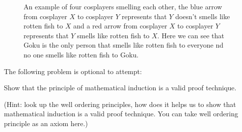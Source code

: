 \documentclass[a4paper]{exam}
\begin{document}
\begin{questions}
\begin{figure}[h!]
   
    
    \caption{An example of four cosplayers smelling each other, the blue arrow from cosplayer $X$ to cosplayer $Y$ represents that $Y$ doesn't smells like rotten fish to $X$ and a red arrow from cosplayer $X$ to cosplayer $Y$ represents that $Y$ smells like rotten fish to $X$. Here we can see that Goku is the only person that smells like rotten fish to everyone nd no one smells like rotten fish to Goku.}
\end{figure}

  \begin{solution}
  \end{solution}
  

  
  
   The following problem is optional to attempt: 
  
  Show that the principle of mathematical induction is a valid proof technique. 

  (Hint: look up the well ordering principles, how does it helps us to show that mathematical induction is a valid proof technique. You can take well ordering principle as an axiom here.)
  \begin{solution}
  \end{solution}
  
\end{questions}
\end{document}
